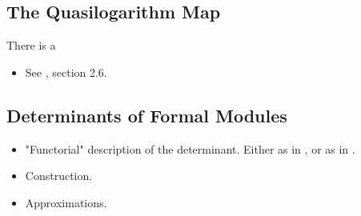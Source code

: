 \documentclass[../main.tex]{subfiles}
\begin{document}

\subsection{The Quasilogarithm Map} %
\label{sub:The Quasilogarithm map}
There is a 
\begin{itemize}
  \item See \cite{BoyarchenkoWeinstein2011MaxVar}, section 2.6.
\end{itemize}

\subsection{Determinants of Formal Modules} %
\label{sub:Determinants of Formal Modules}
\begin{itemize}
  \item "Functorial" description of the determinant. Either as in
    \cite{BoyarchenkoWeinstein2011MaxVar}, or as in \cite{weinstein2016semistable}.
  \item Construction.
  \item Approximations.
\end{itemize}

\end{document}
